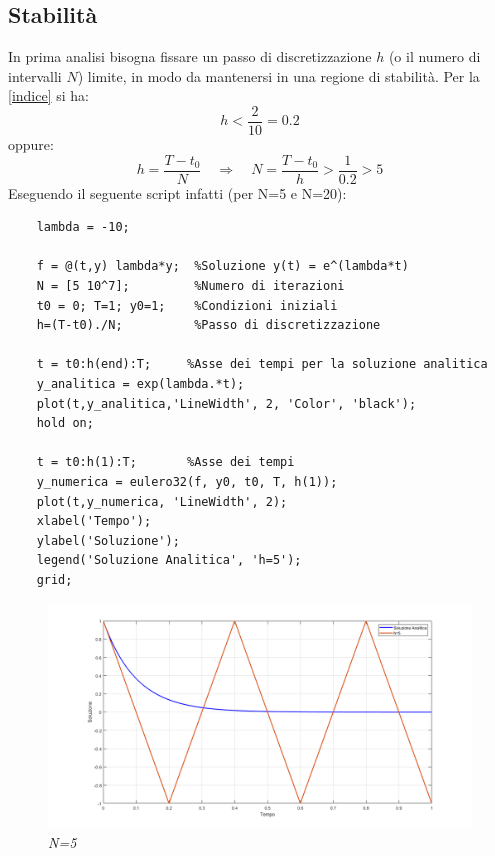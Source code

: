 \subsection{Stabilità}
In prima analisi bisogna fissare un passo di discretizzazione $h$ (o il numero di intervalli $N$) limite, in modo da mantenersi in una regione di stabilità. Per la \ref{indice} si ha:
\begin{equation*}
	h < \dfrac{2}{10} = 0.2
\end{equation*}
oppure:
\begin{equation*}
	h = \dfrac{T-t_0}{N} \quad \Rightarrow \quad N = \dfrac{T-t_0}{h} > \dfrac{1}{0.2} > 5
\end{equation*}
Eseguendo il seguente script infatti (per N=5 e N=20):
\begin{verbatim}
	lambda = -10;
	
	f = @(t,y) lambda*y;  %Soluzione y(t) = e^(lambda*t)
	N = [5 10^7];         %Numero di iterazioni
	t0 = 0; T=1; y0=1;    %Condizioni iniziali 
	h=(T-t0)./N;          %Passo di discretizzazione
	
	t = t0:h(end):T;     %Asse dei tempi per la soluzione analitica
	y_analitica = exp(lambda.*t);
	plot(t,y_analitica,'LineWidth', 2, 'Color', 'black');
	hold on;
	
	t = t0:h(1):T;       %Asse dei tempi
	y_numerica = eulero32(f, y0, t0, T, h(1));
	plot(t,y_numerica, 'LineWidth', 2);
	xlabel('Tempo');
	ylabel('Soluzione');
	legend('Soluzione Analitica', 'h=5');
	grid;
\end{verbatim}
\begin{figure}[H]
	\centering   
	\includegraphics[width=\textwidth]{matlab/esercizio1_stabilita.png}
	\caption{\textit{N=5}}
\end{figure}
